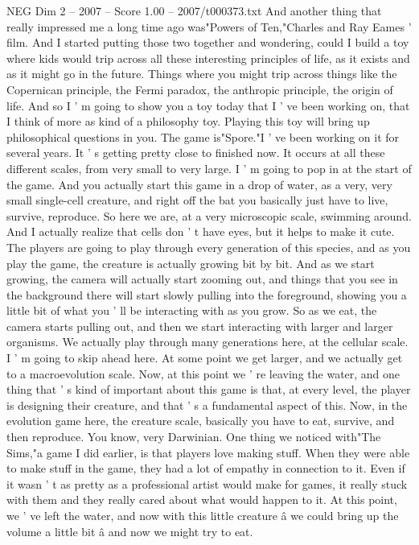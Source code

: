 \begin{textsample}{NEG Dim 2 – 2007 – Score 1.00 – 2007/t000373.txt}
And another thing that really impressed me a long time ago was"Powers of Ten,"Charles and Ray Eames ' film.
And I started putting those two together and wondering, could I build a toy where kids would trip across all these interesting principles of life, as it exists and as it might go in the future.
Things where you might trip across things like the Copernican principle, the Fermi paradox, the anthropic principle, the origin of life.
And so I ' m going to show you a toy today that I ' ve been working on, that I think of more as kind of a philosophy toy.
Playing this toy will bring up philosophical questions in you.
The game is"Spore."I ' ve been working on it for several years.
It ' s getting pretty close to finished now.
It occurs at all these different scales, from very small to very large.
I ' m going to pop in at the start of the game.
And you actually start this game in a drop of water, as a very, very small single-cell creature, and right off the bat you basically just have to live, survive, reproduce.
So here we are, at a very microscopic scale, swimming around.
And I actually realize that cells don ' t have eyes, but it helps to make it cute.
The players are going to play through every generation of this species, and as you play the game, the creature is actually growing bit by bit.
And as we start growing, the camera will actually start zooming out, and things that you see in the background there will start slowly pulling into the foreground, showing you a little bit of what you ' ll be interacting with as you grow.
So as we eat, the camera starts pulling out, and then we start interacting with larger and larger organisms.
We actually play through many generations here, at the cellular scale.
I ' m going to skip ahead here.
At some point we get larger, and we actually get to a macroevolution scale.
Now, at this point we ' re leaving the water, and one thing that ' s kind of important about this game is that, at every level, the player is designing their creature, and that ' s a fundamental aspect of this.
Now, in the evolution game here, the creature scale, basically you have to eat, survive, and then reproduce.
You know, very Darwinian.
One thing we noticed with"The Sims,"a game I did earlier, is that players love making stuff.
When they were able to make stuff in the game, they had a lot of empathy in connection to it.
Even if it wasn ' t as pretty as a professional artist would make for games, it really stuck with them and they really cared about what would happen to it.
At this point, we ' ve left the water, and now with this little creature â we could bring up the volume a little bit â and now we might try to eat.

\end{textsample}
